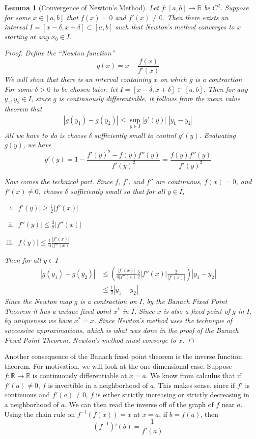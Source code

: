 \documentclass[10pt]{article}         %
\newtheorem{lemma}{Lemma}[section]
\theoremstyle{remark}
\newcommand{\R}{\mathbb{R}}
\begin{document}
\begin{lemma}[Convergence of Newton's Method]
Let $f: [a, b] \rightarrow \R$ be $C^2$. Suppose for some $x \in [a, b]$ that $f(x) = 0$ and $f'(x) \neq 0$. Then there exists an interval $I = [x - \delta, x + \delta] \subset [a, b]$ such that Newton's method converges to $x$ starting at any $x_0 \in I$.
\begin{proof}
Define the ``Newton function''
\[
g(x) = x - \frac{f(x)}{f'(x)}
\]
We will show that there is an interval containing $x$ on which $g$ is a contraction. For some $\delta > 0$ to be chosen later, let $I = [x - \delta, x + \delta ] \subset [a, b]$. Then for any $y_1, y_2 \in I$, since $g$ is continuously differentiable, it follows from the mean value theorem that
\begin{align*}
|g(y_1) - g(y_2)| \leq \sup_{y \in I} |g'(y)| \: |y_1 - y_2|
\end{align*}
All we have to do is choose $\delta$ sufficiently small to control $g'(y)$. Evaluating $g(y)$, we have
\[
g'(y) = 1 - \frac{f'(y)^2 - f(y)f''(y)}{f'(y)^2} = \frac{f(y)f''(y)}{f'(y)^2}
\]

Now comes the technical part. Since $f$, $f'$, and $f''$ are continuous, $f(x) = 0$, and $f'(x) \neq 0$, choose $\delta$ sufficiently small so that for all $y \in I$,
\begin{enumerate}[(i)]
	\item $|f'(y)| \geq \frac{1}{2}|f'(x)|$ 
	\item $|f''(y)| \leq \frac{3}{2}|f''(x)|$
	\item $|f(y)| \leq \frac{1}{6} \frac{|f'(x)|}{ |f''(x)}$
\end{enumerate}
Then for all $y \in I$
\begin{align*}
|g(y_1) - g(y_2)| &\leq 
\left( \frac{|f'(x)|}{6 |f''(x)} \frac{3}{2}|f''(x)| \frac{2}{|f'(x)|}\right)|y_1 - y_2| \\ 
&\leq \frac{1}{2}|y_1 - y_2| 
\end{align*}
Since the Newton map $g$ is a contraction on $I$, by the Banach Fixed Point Theorem it has a unique fixed point $x^*$ in $I$. Since $x$ is also a fixed point of $g$ in $I$, by uniqueness we have $x^* = x$. Since Newton's method uses the technique of successive approximations, which is what was done in the proof of the Banach Fixed Point Theorem, Newton's method must converge to $x$.
\end{proof}
\end{lemma}

Another consequence of the Banach fixed point theorem is the inverse function theorem. For motivation, we will look at the one-dimensional case. Suppose $f: \R \rightarrow \R$ is continuously differentiable at $x = a$. We know from calculus that if $f'(a) \neq 0$, $f$ is invertible in a neighborhood of $a$. This makes sense, since if $f'$ is continuous and $f'(a) \neq 0$, $f$ is either strictly increasing or strictly decreasing in a neighborhood of $a$. We can then read the inverse off of the graph of $f$ near $a$. Using the chain rule on $f^{-1}(f(x)) = x$ at $x = a$, if $b = f(a)$, then
\[
(f^{-1})'(b) = \frac{1}{f'(a)}
\]
\end{document}
